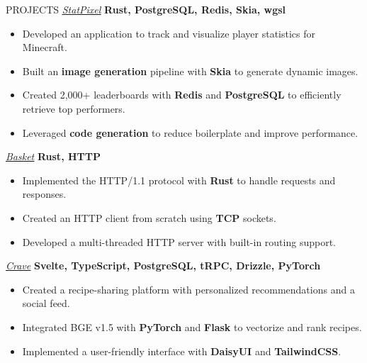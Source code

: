 \documentclass{resume}
\begin{document}
\begin{rSection}{PROJECTS}
	\href{https://github.com/statpixel-rs/statpixel}{\underline{\textit{StatPixel}}} \textbf{Rust, PostgreSQL, Redis, Skia, wgsl}
	\vspace{-8pt}
	\begin{itemize}
		\itemsep -6pt {}
		\item Developed an application to track and visualize player statistics for Minecraft.
		\item Built an \textbf{image generation} pipeline with \textbf{Skia} to generate dynamic images.
		\item Created 2,000+ leaderboards with \textbf{Redis} and \textbf{PostgreSQL} to efficiently retrieve top performers.
		\item Leveraged \textbf{code generation} to reduce boilerplate and improve performance.
	\end{itemize}

	\vspace{-4pt}

	\href{https://github.com/matteopolak/basket}{\underline{\textit{Basket}}} \textbf{Rust, HTTP}
	\vspace{-8pt}
	\begin{itemize}
		\itemsep -6pt {}
		\item Implemented the HTTP/1.1 protocol with \textbf{Rust} to handle requests and responses.
		\item Created an HTTP client from scratch using \textbf{TCP} sockets.
		\item Developed a multi-threaded HTTP server with built-in routing support.
	\end{itemize}

	\vspace{-4pt}

	\href{https://github.com/matteopolak/crave}{\underline{\textit{Crave}}} \textbf{Svelte, TypeScript, PostgreSQL, tRPC, Drizzle, PyTorch}
	\vspace{-8pt}
	\begin{itemize}
		\itemsep -6pt {}
		\item Created a recipe-sharing platform with personalized recommendations and a social feed.
		\item Integrated BGE v1.5 with \textbf{PyTorch} and \textbf{Flask} to vectorize and rank recipes.
		\item Implemented a user-friendly interface with \textbf{DaisyUI} and \textbf{TailwindCSS}.
	\end{itemize}
\end{rSection}
\end{document}
